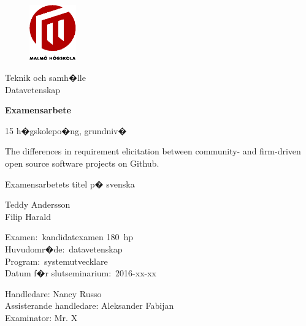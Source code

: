 \documentclass[a4paper,11pt]{article}
\begin{document}
\let\rempage=\thepage
{
\renewcommand{\thepage}{\relax}
\begin{figure}
	\includegraphics[width=0.18\textwidth]{mahlogo-name}
\end{figure}

\vspace*{-30mm}
\hfill\begin{minipage}[t]{10em}\large
Teknik och samh�lle\\
Datavetenskap
\end{minipage}

\vspace*{45mm}
\begin{center}
{\bf\large
Examensarbete

\small
15 h�gskolepo�ng, grundniv�
}

\vspace*{25mm}
\LARGE

The differences in requirement elicitation between community- and firm-driven open source software projects on Github.

\vspace*{8mm}
\large

Examensarbetets titel p� svenska %

\vspace*{12mm}
\Large
%
Teddy Andersson\\
Filip Harald

\vspace*{30mm}
\large
\end{center}

\vfill
\hspace*{-10mm}%
\begin{minipage}[t]{20em}
%
Examen:~kandidatexamen 180~hp
\\
Huvudomr�de:~datavetenskap
\\
Program:~systemutvecklare
\\
Datum f�r slutseminarium:~2016-xx-xx %
\end{minipage}
\hfill
\begin{minipage}[t]{20em}
Handledare: Nancy Russo
\\
Assisterande handledare: Aleksander Fabijan
\\
Examinator: Mr. X
\end{minipage}

}
\end{document}
